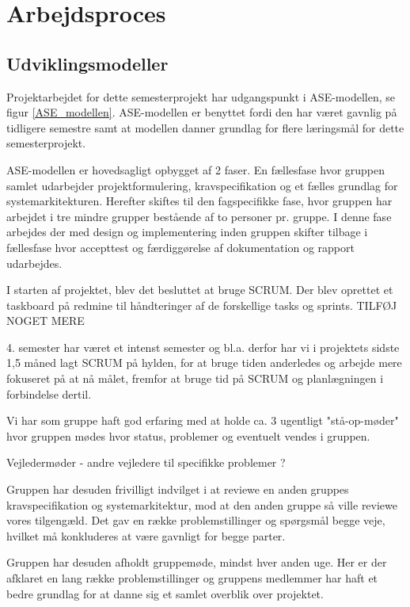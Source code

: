 
\chapter{Arbejdsproces}

\section{Udviklingsmodeller}

Projektarbejdet for dette semesterprojekt har udgangspunkt i ASE-modellen, se figur \ref{ASE_modellen}. ASE-modellen er benyttet fordi den har været gavnlig på tidligere semestre samt at modellen danner grundlag for flere læringsmål for dette semesterprojekt.

ASE-modellen er hovedsagligt opbygget af 2 faser. En fællesfase hvor gruppen samlet udarbejder projektformulering, kravspecifikation og et fælles grundlag for systemarkitekturen. Herefter skiftes til den fagspecifikke fase, hvor gruppen har arbejdet i tre mindre grupper bestående af to personer pr. gruppe. I denne fase arbejdes der med design og implementering inden gruppen skifter tilbage i fællesfase hvor accepttest og færdiggørelse af dokumentation og rapport udarbejdes. 


I starten af projektet, blev det besluttet at bruge SCRUM. Der blev oprettet et taskboard på redmine til håndteringer af de forskellige tasks og sprints. TILFØJ NOGET MERE

4. semester har været et intenst semester og bl.a. derfor har vi i projektets sidste 1,5 måned lagt SCRUM på hylden, for at bruge tiden anderledes og arbejde mere fokuseret på at nå målet, fremfor at bruge tid på SCRUM og planlægningen i forbindelse dertil. 

Vi har som gruppe haft god erfaring med at holde ca. 3 ugentligt "stå-op-møder" hvor gruppen mødes hvor status, problemer og eventuelt vendes i gruppen. 

Vejledermøder - andre vejledere til specifikke problemer ?

Gruppen har desuden frivilligt indvilget i at reviewe en anden gruppes kravspecifikation og systemarkitektur, mod at den anden gruppe så ville reviewe vores tilgengæld. Det gav en række problemstillinger og spørgsmål begge veje, hvilket må konkluderes at være gavnligt for begge parter.

Gruppen har desuden afholdt gruppemøde, mindst hver anden uge. Her er der afklaret en lang række problemstillinger og gruppens medlemmer har haft et bedre grundlag for at danne sig et samlet overblik over projektet. 

